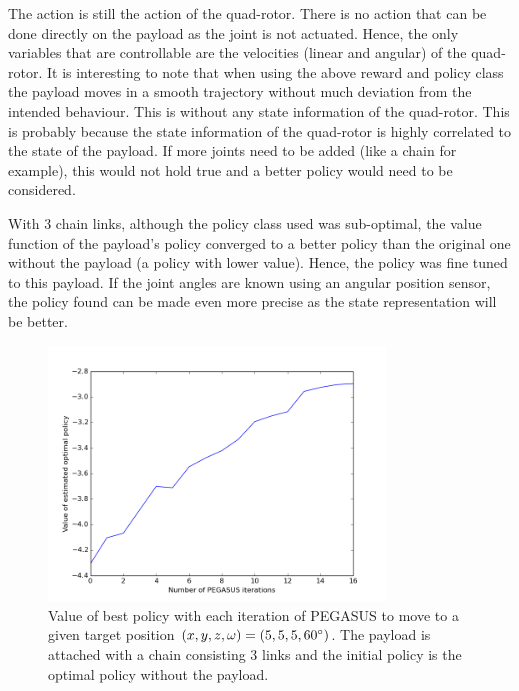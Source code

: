 \documentclass[hidelinks,BTech]{iitmdiss}
\begin{document}
The action is still the action of the quad-rotor. There is no action that can be done directly on the payload as the joint is not actuated. Hence, the only variables that are controllable are the velocities (linear and angular) of the quad-rotor. It is interesting to note that when using the above reward and policy class the payload moves in a smooth trajectory without much deviation from the intended behaviour. This is without any state information of the quad-rotor. This is probably because the state information of the quad-rotor is highly correlated to the state of the payload. If more joints need to be added (like a chain for example), this would not hold true and a better policy would need to be considered.

With 3 chain links, although the policy class used was sub-optimal, the value function of the payload's policy converged to a better policy than the original one without the payload (a policy with lower value). Hence, the policy was fine tuned to this payload. If the joint angles are known using an angular position sensor, the policy found can be made even more precise as the state representation will be better.

\begin{figure}[H]
  \centering
    \includegraphics[width=0.8\textwidth]{payload_position_control_time.png}
    \caption{Value of best policy with each iteration of PEGASUS to move to a given target position $(x, y, z, \omega) = (5, 5, 5, 60\protect^{\circ})$. The payload is attached with a chain consisting 3 links and the initial policy is the optimal policy without the payload.}
\end{figure}
\end{document}
